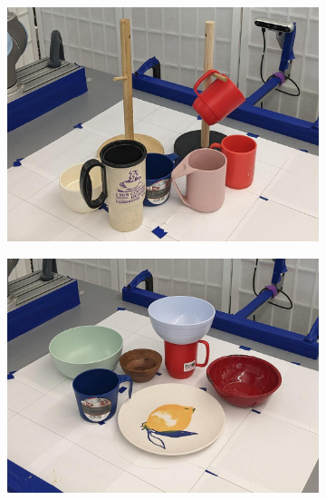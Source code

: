 \documentclass{article}
\begin{document}
\begin{figure}[]
    \centering

    \begin{subfigure}{(\linewidth - 0.05\linewidth)/3}
        \centering
        \includegraphics[width=\linewidth]{figures/object_sets/mug_on_tree.jpg}
        \caption{}
    \end{subfigure}
    \begin{subfigure}{(\linewidth - 0.05\linewidth)/3}
        \centering
        \includegraphics[width=\linewidth]{figures/object_sets/bowl_on_mug.jpg}
        \caption{}
    \end{subfigure}
    \begin{subfigure}{(\linewidth - 0.05\linewidth)/3}

\end{subfigure}
\end{figure}
\end{document}

